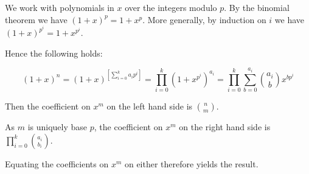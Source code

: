 \documentclass[12pt]{article}
\begin{document}
We work with polynomials in $x$ over the integers modulo $p$.  \newline By
the binomial theorem we have $(1+x)^p = 1 + x^p$.   More
generally, by induction on $i$ we have $(1+x)^{p^i} = 1+x^{p^i}$.


Hence the following holds:

$$
(1+x)^n=(1+x)^{\left[\sum_{i=0}^{k}a_i p^i \right ]} =
\prod_{i=0}^k (1+x^{p^i})^{a_i} = \prod_{i=0}^k \sum_{b=0}^{a_i}
{{a_i}\choose {b}} x^{bp^i}
$$

Then the coefficient on $x^m$ on the left hand side is $n \choose
m$.

As $m$ is uniquely  base $p$, the coefficient on $x^m$
on the right hand side is $\prod_{i=0}^k {a_i \choose b_i}$.

Equating the coefficients on $x^m$ on either  therefore yields
the result.

\end{document}
